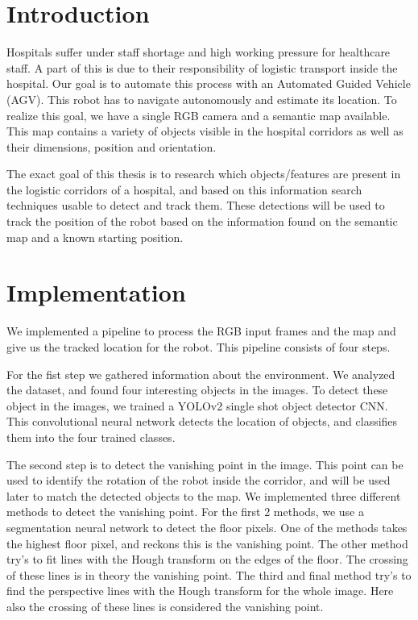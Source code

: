 \section*{Introduction}
Hospitals suffer under staff shortage and high working pressure for healthcare staff.
A part of this is due to their responsibility of logistic transport inside the hospital.
Our goal is to automate this process with an Automated Guided Vehicle (AGV).
This robot has to navigate autonomously and estimate its location.
To realize this goal, we have a single RGB camera and a semantic map available.
This map contains a variety of objects visible in the hospital corridors as well as their dimensions, position and orientation.

The exact goal of this thesis is to research which objects/features are present in the logistic corridors of a hospital, and based on this
information search techniques usable to detect and track them.
These detections will be used to track the position of the robot based on the information found on the semantic map and a known starting position.


\section*{Implementation}
We implemented a pipeline to process the RGB input frames and the map and give us the tracked location for the robot.
This pipeline consists of four steps.

For the fist step we gathered information about the environment.
We analyzed the dataset, and found four interesting objects in the images.
To detect these object in the images, we trained a YOLOv2 single shot object detector CNN.
This convolutional neural network detects the location of objects, and classifies them into the four trained classes.

The second step is to detect the vanishing point in the image.
This point can be used to identify the rotation of the robot inside the corridor, and will be used later to match the detected objects to the map.
We implemented three different methods to detect the vanishing point.
For the first 2 methods, we use a segmentation neural network to detect the floor pixels.
One of the methods takes the highest floor pixel, and reckons this is the vanishing point.
The other method try's to fit lines with the Hough transform on the edges of the floor.
The crossing of these lines is in theory the vanishing point.
The third and final method try's to find the perspective lines with the Hough transform for the whole image.
Here also the crossing of these lines is considered the vanishing point.


